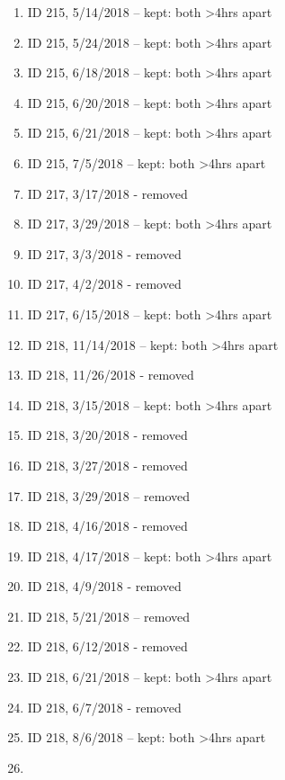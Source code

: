 \documentclass[
]{book}
\providecommand{\tightlist}{%
  \setlength{\itemsep}{0pt}\setlength{\parskip}{0pt}}
\begin{document}
\begin{itemize}
\begin{itemize}
    \begin{enumerate}
    \def\labelenumi{\arabic{enumi}.}
    \tightlist
    \item
      ID 215, 5/14/2018 -- kept: both \textgreater4hrs apart
    \item
      ID 215, 5/24/2018 -- kept: both \textgreater4hrs apart
    \item
      ID 215, 6/18/2018 -- kept: both \textgreater4hrs apart
    \item
      ID 215, 6/20/2018 -- kept: both \textgreater4hrs apart
    \item
      ID 215, 6/21/2018 -- kept: both \textgreater4hrs apart
    \item
      ID 215, 7/5/2018 -- kept: both \textgreater4hrs apart
    \item
      ID 217, 3/17/2018 - removed
    \item
      ID 217, 3/29/2018 -- kept: both \textgreater4hrs apart
    \item
      ID 217, 3/3/2018 - removed
    \item
      ID 217, 4/2/2018 - removed
    \item
      ID 217, 6/15/2018 -- kept: both \textgreater4hrs apart
    \item
      ID 218, 11/14/2018 -- kept: both \textgreater4hrs apart
    \item
      ID 218, 11/26/2018 - removed
    \item
      ID 218, 3/15/2018 -- kept: both \textgreater4hrs apart
    \item
      ID 218, 3/20/2018 - removed
    \item
      ID 218, 3/27/2018 - removed
    \item
      ID 218, 3/29/2018 -- removed
    \item
      ID 218, 4/16/2018 - removed
    \item
      ID 218, 4/17/2018 -- kept: both \textgreater4hrs apart
    \item
      ID 218, 4/9/2018 - removed
    \item
      ID 218, 5/21/2018 -- removed
    \item
      ID 218, 6/12/2018 - removed
    \item
      ID 218, 6/21/2018 -- kept: both \textgreater4hrs apart
    \item
      ID 218, 6/7/2018 - removed
    \item
      ID 218, 8/6/2018 -- kept: both \textgreater4hrs apart
    \item

\end{enumerate}
\end{itemize}
\end{itemize}
\end{document}
